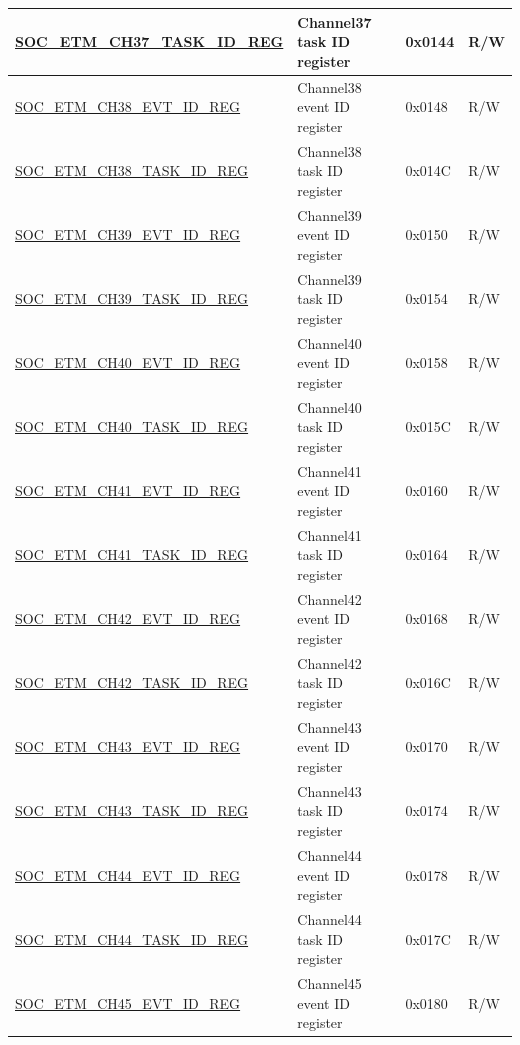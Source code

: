 \begin{longtable}{ | p{6cm} | p{6.4cm} | p{1.3cm} | p{1.8cm} | }
\hyperref[regdesc:SOCETMCH0TASKIDREG]{SOC\_ETM\_CH37\_TASK\_ID\_REG} & Channel37 task ID register & 0x0144 & R/W \\ \hline
\hyperref[regdesc:SOCETMCH0EVTIDREG]{SOC\_ETM\_CH38\_EVT\_ID\_REG} & Channel38 event ID register & 0x0148 & R/W \\ \hline
\hyperref[regdesc:SOCETMCH0TASKIDREG]{SOC\_ETM\_CH38\_TASK\_ID\_REG} & Channel38 task ID register & 0x014C & R/W \\ \hline
\hyperref[regdesc:SOCETMCH0EVTIDREG]{SOC\_ETM\_CH39\_EVT\_ID\_REG} & Channel39 event ID register & 0x0150 & R/W \\ \hline
\hyperref[regdesc:SOCETMCH0TASKIDREG]{SOC\_ETM\_CH39\_TASK\_ID\_REG} & Channel39 task ID register & 0x0154 & R/W \\ \hline
\hyperref[regdesc:SOCETMCH0EVTIDREG]{SOC\_ETM\_CH40\_EVT\_ID\_REG} & Channel40 event ID register & 0x0158 & R/W \\ \hline
\hyperref[regdesc:SOCETMCH0TASKIDREG]{SOC\_ETM\_CH40\_TASK\_ID\_REG} & Channel40 task ID register & 0x015C & R/W \\ \hline
\hyperref[regdesc:SOCETMCH0EVTIDREG]{SOC\_ETM\_CH41\_EVT\_ID\_REG} & Channel41 event ID register & 0x0160 & R/W \\ \hline
\hyperref[regdesc:SOCETMCH0TASKIDREG]{SOC\_ETM\_CH41\_TASK\_ID\_REG} & Channel41 task ID register & 0x0164 & R/W \\ \hline
\hyperref[regdesc:SOCETMCH0EVTIDREG]{SOC\_ETM\_CH42\_EVT\_ID\_REG} & Channel42 event ID register & 0x0168 & R/W \\ \hline
\hyperref[regdesc:SOCETMCH0TASKIDREG]{SOC\_ETM\_CH42\_TASK\_ID\_REG} & Channel42 task ID register & 0x016C & R/W \\ \hline
\hyperref[regdesc:SOCETMCH0EVTIDREG]{SOC\_ETM\_CH43\_EVT\_ID\_REG} & Channel43 event ID register & 0x0170 & R/W \\ \hline
\hyperref[regdesc:SOCETMCH0TASKIDREG]{SOC\_ETM\_CH43\_TASK\_ID\_REG} & Channel43 task ID register & 0x0174 & R/W \\ \hline
\hyperref[regdesc:SOCETMCH0EVTIDREG]{SOC\_ETM\_CH44\_EVT\_ID\_REG} & Channel44 event ID register & 0x0178 & R/W \\ \hline
\hyperref[regdesc:SOCETMCH0TASKIDREG]{SOC\_ETM\_CH44\_TASK\_ID\_REG} & Channel44 task ID register & 0x017C & R/W \\ \hline
\hyperref[regdesc:SOCETMCH0EVTIDREG]{SOC\_ETM\_CH45\_EVT\_ID\_REG} & Channel45 event ID register & 0x0180 & R/W \\ \hline

\end{longtable}
